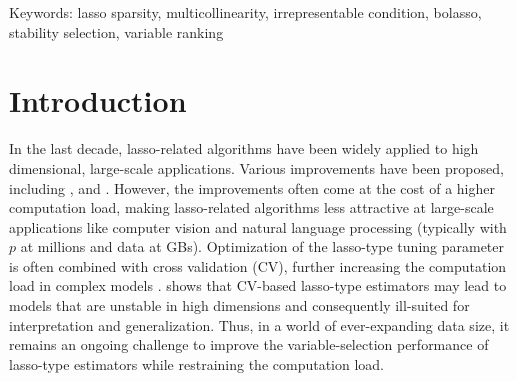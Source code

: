 \documentclass[12pt]{article}
\begin{document}
\noindent
\normalsize
Keywords: lasso sparsity, multicollinearity, irrepresentable condition, bolasso, stability selection, variable ranking

\vfill
\newpage
{} 


\clearpage
{}

\section{Introduction}

In the last decade, lasso-related algorithms have been widely applied to high dimensional, large-scale applications. Various improvements have been proposed, including \citet{zou2005regularization}, \citet{zou2006adaptive} and \citet{friedman10}. However, the improvements often come at the cost of a higher computation load, making lasso-related algorithms less attractive at large-scale applications like computer vision and natural language processing (typically with $p$ at millions and data at GBs). Optimization of the lasso-type tuning parameter is often combined with cross validation (CV), further increasing the computation load in complex models \citep{xu2012asymptotic}. \citet{lim2016estimation} shows that CV-based lasso-type estimators may lead to models that are unstable in high dimensions and consequently ill-suited for interpretation and generalization. Thus, in a world of ever-expanding data size, it remains an ongoing challenge to improve the variable-selection performance of lasso-type estimators while restraining the computation load.
\end{document}
